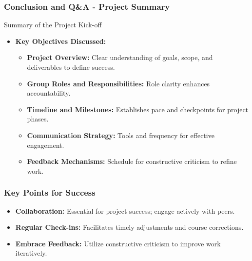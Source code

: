 \documentclass[aspectratio=169]{beamer}
\begin{document}
\begin{frame}[fragile]
    \frametitle{Conclusion and Q\&A - Project Summary}
    
    \begin{block}{Summary of the Project Kick-off}
        \begin{itemize}
            \item \textbf{Key Objectives Discussed:}
            \begin{itemize}
                \item \textbf{Project Overview:} Clear understanding of goals, scope, and deliverables to define success.
                \item \textbf{Group Roles and Responsibilities:} Role clarity enhances accountability. 
                \item \textbf{Timeline and Milestones:} Establishes pace and checkpoints for project phases.
                \item \textbf{Communication Strategy:} Tools and frequency for effective engagement.
                \item \textbf{Feedback Mechanisms:} Schedule for constructive criticism to refine work. 
            \end{itemize}
        \end{itemize}
    \end{block}
\end{frame}

\begin{frame}[fragile]
    \frametitle{Key Points for Success}
    
    \begin{itemize}
        \item \textbf{Collaboration:} Essential for project success; engage actively with peers.
        \item \textbf{Regular Check-ins:} Facilitates timely adjustments and course corrections.
        \item \textbf{Embrace Feedback:} Utilize constructive criticism to improve work iteratively.
    \end{itemize}
\end{frame}
\end{document}
